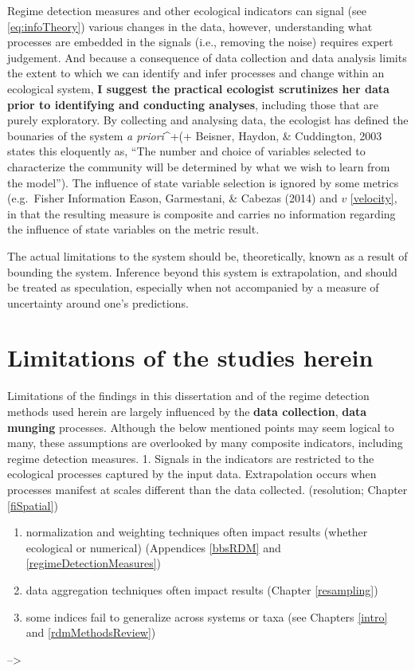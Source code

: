 \documentclass[12pt,twoside,openany]{reedthesis}
\begin{document}
Regime detection measures and other ecological indicators can signal
(see \eqref{eq:infoTheory}) various changes in the data, however,
understanding what processes are embedded in the signals (i.e., removing
the noise) requires expert judgement. And because a consequence of data
collection and data analysis limits the extent to which we can identify
and infer processes and change within an ecological system, \textbf{I
suggest the practical ecologist scrutinizes her data prior to
identifying and conducting analyses}, including those that are purely
exploratory. By collecting and analysing data, the ecologist has defined
the bounaries of the system \emph{a priori}\^{}+(+ Beisner, Haydon, \&
Cuddington, 2003 states this eloquently as, ``The number and choice of
variables selected to characterize the community will be determined by
what we wish to learn from the model''). The influence of state variable
selection is ignored by some metrics (e.g.~Fisher Information Eason,
Garmestani, \& Cabezas (2014) and \(v\) \ref{velocity}, in that the
resulting measure is composite and carries no information regarding the
influence of state variables on the metric result.

The actual limitations to the system should be, theoretically, known as
a result of bounding the system. Inference beyond this system is
extrapolation, and should be treated as speculation, especially when not
accompanied by a measure of uncertainty around one's predictions.

\section{Limitations of the studies
herein}\label{limitations-of-the-studies-herein}

Limitations of the findings in this dissertation and of the regime
detection methods used herein are largely influenced by the \textbf{data
collection}, \textbf{data munging} processes. Although the below
mentioned points may seem logical to many, these assumptions are
overlooked by many composite indicators, including regime detection
measures. 1. Signals in the indicators are restricted to the ecological
processes captured by the input data. Extrapolation occurs when
processes manifest at scales different than the data collected.
(resolution; Chapter \ref{fiSpatial})
\begin{enumerate}
\def\labelenumi{\arabic{enumi}.}
\item
  normalization and weighting techniques often impact results (whether
  ecological or numerical) (Appendices \ref{bbsRDM} and
  \ref{regimeDetectionMeasures})
\item
  data aggregation techniques often impact results (Chapter
  \ref{resampling})
\item
  some indices fail to generalize across systems or taxa (see Chapters
  \ref{intro} and \ref{rdmMethodsReview})
\end{enumerate}
--\textgreater{}
\end{document}
